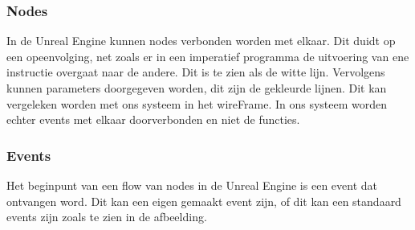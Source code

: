 \documentclass[]{article}
\begin{document}
\subsubsection{Nodes}
In de Unreal Engine kunnen nodes verbonden worden met elkaar. Dit duidt op een opeenvolging, net zoals er in een imperatief programma de uitvoering van ene instructie overgaat naar de andere. Dit is te zien als de witte lijn. Vervolgens kunnen parameters doorgegeven worden, dit zijn de gekleurde lijnen. Dit kan vergeleken worden met ons systeem in het wireFrame. In ons systeem worden echter events met elkaar doorverbonden en niet de functies. \cite{unreal}
\subsubsection{Events}
Het beginpunt van een flow van nodes in de Unreal Engine is een event dat ontvangen word. Dit kan een eigen gemaakt event zijn, of dit kan een standaard events zijn zoals te zien in de afbeelding.
\end{document}
